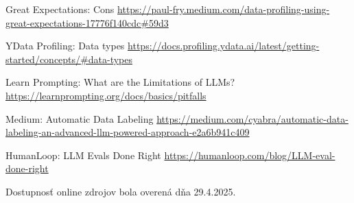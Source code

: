 \begin{thebibliography}{99}
Great Expectations: Cons
\url{https://paul-fry.medium.com/data-profiling-using-great-expectations-17776f140cdc#59d3}

YData Profiling: Data types
\url{https://docs.profiling.ydata.ai/latest/getting-started/concepts/#data-types}

Learn Prompting: What are the Limitations of LLMs?
\url{https://learnprompting.org/docs/basics/pitfalls}

Medium: Automatic Data Labeling
\url{https://medium.com/cyabra/automatic-data-labeling-an-advanced-llm-powered-approach-e2a6b941c409}

HumanLoop: LLM Evals Done Right
\url{https://humanloop.com/blog/LLM-eval-done-right}
\end{thebibliography}

Dostupnosť online zdrojov bola overená dňa 29.4.2025.
